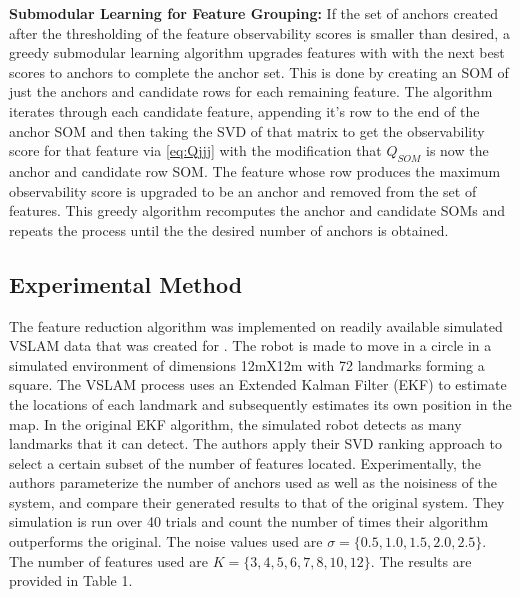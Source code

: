 \documentclass[10pt,twocolumn,letterpaper]{article}
\begin{document}
\textbf{Submodular Learning for Feature Grouping:} If the set of anchors created after the thresholding of the feature observability scores is smaller than desired, a greedy submodular learning algorithm upgrades features with with the next best scores to anchors to complete the anchor set. This is done by creating an SOM of just the anchors and candidate rows for each remaining feature. The algorithm iterates through each candidate feature, appending it's row to the end of the anchor SOM and then taking the SVD of that matrix to get the observability score for that feature via \eqref{eq:Qjjj} with the modification that $Q_{SOM}$ is now the anchor and candidate row SOM. The feature whose row produces the maximum observability score is upgraded to be an anchor and removed from the set of features. This greedy algorithm recomputes the anchor and candidate SOMs and repeats the process until the the desired number of anchors is obtained.

\subsection{Experimental Method}
The feature reduction algorithm was implemented on readily 
available simulated VSLAM data that was created for \cite{31}. 
The robot is made to move in a circle in a simulated environment of dimensions 12mX12m with 72 
landmarks forming a square. The VSLAM process uses an Extended Kalman Filter (EKF) to estimate the locations 
of each landmark and subsequently estimates its own position in the map. In the original EKF algorithm, the 
simulated robot detects as many landmarks that it can detect. The authors apply their SVD ranking approach
 to select a certain subset of the number of features located. Experimentally, the authors parameterize the number of anchors used as well as the noisiness of the system, and compare their generated results to that of the original system. They simulation is run over 40 trials and count the number of times their 
 algorithm outperforms the original. The noise values used are $\sigma=\{0.5, 1.0, 1.5, 2.0, 2.5\} $. 
The number of features used are $ K = \{ 3, 4, 5, 6, 7, 8, 10, 12 \}$. 
The results are provided in Table 1. 
\end{document}
